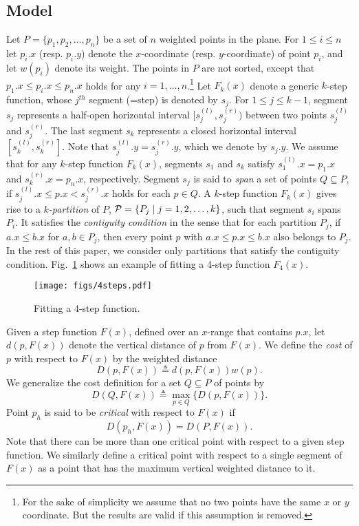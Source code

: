 \documentclass[preprint,10pt]{elsarticle}
\begin{document}
\subsection{Model}\label{sec:model}
Let $P=\{p_1,p_2,\ldots, p_n\}$ be a set of $n$ weighted points in the plane.
For $1\leq i\leq n$ let $p_i.x$ (resp. $p_i.y$) denote the $x$-coordinate (resp. $y$-coordinate)
of point $p_i$, and let $w(p_i)$ denote its weight.
The points in $P$ are not sorted,
except that $p_1.x\leq p_i.x\leq p_n.x$ holds for any $i=1, \ldots, n$.\footnote{For the sake
of simplicity we assume that no two points have the same $x$ or $y$ coordinate.
But the results are valid if this assumption is removed.
}
Let $F_k(x)$ denote a generic $k$-step function,
whose $j^{th}$ segment (=step) is denoted by $s_j$.
For $1\leq j \leq k-1$, segment $s_j$ represents a half-open horizontal interval $[s_j^{(l)}, s_j^{(r)})$
between two points $s_j^{(l)}$ and $s_j^{(r)}$.
The last segment $s_k$ represents a closed horizontal interval $[s_k^{(l)}, s_k^{(r)}]$.
Note that $s_j^{(l)}.y= s_j^{(r)}.y$,
which we denote by $s_j.y$.
We assume that for any $k$-step function $F_k(x)$,
 segments $s_1$ and $s_k$ satisfy $s_1^{(l)}.x = p_1.x$ and $s_k^{(r)}.x = p_n.x$,
respectively.
Segment $s_j$ is said to {\em span} a set of points $Q\subseteq P$,
if $s_j^{(l)}.x \leq p.x <s_j^{(r)}.x$ holds for each $p\in Q$.
A $k$-step function $F_k(x)$ gives rise to a {\em $k$-partition} of $P$, 
${\cal P}= \{P_j \mid j = 1, 2, \ldots, k\}$,
 such that segment $s_i$ spans $P_i$.
 It satisfies the {\em contiguity condition} in the sense that for each partition $P_j$,
if $a.x \leq b.x$ for $a,b\in P_j$,
then every point $p$ with $a.x \leq p.x \leq b.x$ also belongs to $P_j$.
In the rest of this paper, we
consider only partitions that satisfy the contiguity condition.
Fig.~\ref{fig:4steps} shows an example of fitting a 4-step function $F_4(x)$.
\begin{figure}[ht]
\centering
\texttt{[image: figs/4steps.pdf]}
\hspace{2mm}
\caption{Fitting a 4-step function.
}
\label{fig:4steps}
\end{figure}

Given a step function $F(x)$, 
defined over an $x$-range that contains $p.x$,
let $d(p, F(x))$ denote the vertical distance of $p$ from $F(x)$.
We define the {\em cost} of $p$ with respect to $F(x)$
by the weighted distance
\begin{equation}\label{eqn:pointCost}
D(p, F(x))\triangleq d(p, F(x))w(p).
\end{equation}
We generalize the cost definition for a set $Q \subseteq P$ of points by
\begin{equation}\label{eqn:setCost}
D(Q, F(x)) \triangleq \max_{p \in Q} \{D(p, F(x))\}.
\end{equation}
Point $p_h$ is said to be {\em critical} with respect to $F(x)$ if
\begin{equation}
D(p_h, F(x)) = D(P, F(x)).
\end{equation}
Note that there can be more than one critical point with respect to a given step function.
We similarly define a critical point with respect to a single segment of $F(x)$
as a point that has the maximum vertical weighted distance to it.
\end{document}
